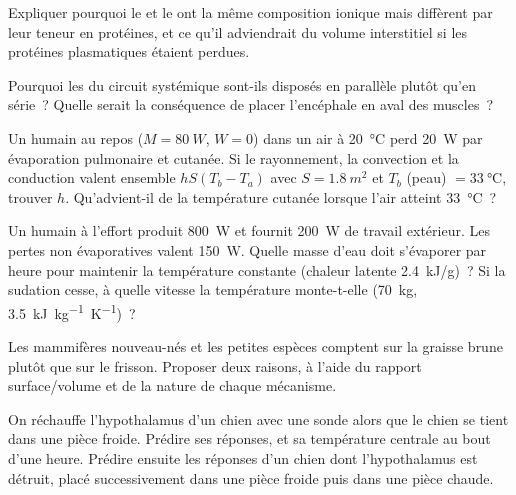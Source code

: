 \begin{exercise}[$\star\star$]\label{exo:b1:mammal-organization:6}
Expliquer pourquoi le  et le  ont la même
composition ionique mais diffèrent par leur teneur en protéines, et ce
qu'il adviendrait du volume interstitiel si les protéines plasmatiques
étaient perdues.
\end{exercise}

\begin{exercise}[$\star\star$]\label{exo:b1:mammal-organization:7}
Pourquoi les  du circuit systémique sont-ils disposés en
parallèle plutôt qu'en série~? Quelle serait la conséquence de placer
l'encéphale en aval des muscles~?
\end{exercise}

\begin{exercise}[$\star\star$]\label{exo:b1:mammal-organization:8}
Un humain au repos ($M = \qty{80}{W}$, $W = 0$) dans un air à
\qty{20}{\celsius} perd \qty{20}{W} par évaporation pulmonaire et
cutanée. Si le rayonnement, la convection et la conduction valent
ensemble $hS(T_b - T_a)$ avec $S = \qty{1.8}{m^2}$ et $T_b$ (peau) $=
\qty{33}{\celsius}$, trouver $h$. Qu'advient-il de la température
cutanée lorsque l'air atteint \qty{33}{\celsius}~?
\end{exercise}

\begin{exercise}[$\star\star$]\label{exo:b1:mammal-organization:9}
Un humain à l'effort produit \qty{800}{W} et fournit \qty{200}{W} de
travail extérieur. Les pertes non évaporatives valent \qty{150}{W}.
Quelle masse d'eau doit s'évaporer par heure pour maintenir la
température constante (chaleur latente \qty{2.4}{kJ/g})~? Si la sudation
cesse, à quelle vitesse la température monte-t-elle (\qty{70}{kg},
\qty{3.5}{kJ.kg^{-1}.K^{-1}})~?
\end{exercise}

\begin{exercise}[$\star\star\star$]\label{exo:b1:mammal-organization:10}
Les mammifères nouveau-nés et les petites espèces comptent sur la
graisse brune plutôt que sur le frisson. Proposer deux raisons, à
l'aide du rapport surface/volume et de la nature de chaque mécanisme.
\end{exercise}

\begin{exercise}[$\star\star\star$]\label{exo:b1:mammal-organization:11}
On réchauffe l'hypothalamus d'un chien avec une sonde alors que le chien
se tient dans une pièce froide. Prédire ses réponses, et sa température
centrale au bout d'une heure. Prédire ensuite les réponses d'un chien
dont l'hypothalamus est détruit, placé successivement dans une pièce
froide puis dans une pièce chaude.
\end{exercise}

